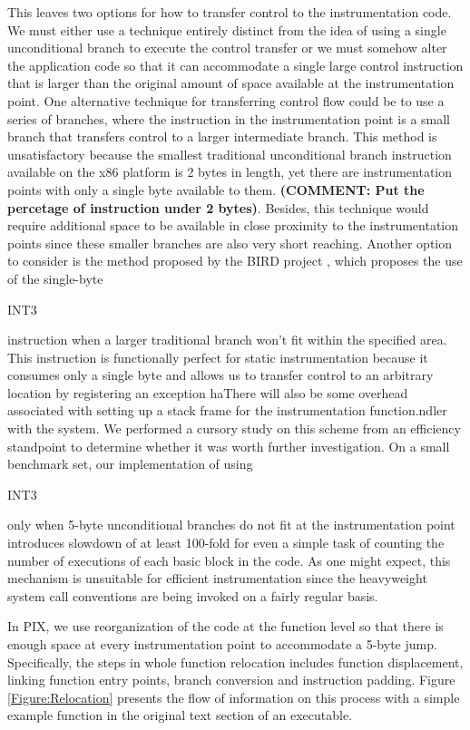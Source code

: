 This leaves two options for how to transfer control to the instrumentation code.
We must either use a technique entirely distinct from the idea of using a single
unconditional branch to execute the control transfer or we must somehow alter the application code so
that it can accommodate a single large control instruction that is larger than
the original amount of space available at the instrumentation point. One alternative
technique for transferring control flow could be to use a series of branches,
where the instruction in the instrumentation point is a small branch that
transfers control to a larger intermediate branch. This
method is unsatisfactory because the smallest traditional unconditional branch instruction available
on the x86 platform is 2 bytes in length, yet there are
instrumentation points with only a single byte available to them. \textbf{(COMMENT: Put the percetage of instruction under 2 bytes)}.
Besides, this technique would
require additional space to be available in close proximity to the instrumentation points since these
smaller branches are also very short reaching. Another option
to consider is the method proposed by the BIRD project \cite{nanda2006bird}, which
proposes the use of the single-byte \begin{it}INT3\end{it} instruction when a larger traditional
branch won't fit within the specified area. This instruction is functionally
perfect for static instrumentation because it consumes only a single byte and
allows us to transfer control to an arbitrary location by registering an
exception haThere will also be some overhead
associated with setting up a stack frame for the instrumentation function.ndler with the system. We performed a cursory study on this scheme
from an efficiency standpoint to determine whether it was worth further
investigation. On a small benchmark set, our implementation of using
\begin{it}INT3\end{it} only when 5-byte unconditional branches do not fit at
the instrumentation point introduces slowdown of at least 100-fold for
even a simple task of counting the number of executions of each basic block in the code. As one might
expect, this mechanism is unsuitable for efficient instrumentation since the
 heavyweight system call conventions are being invoked on a fairly regular basis.

In PIX, we use reorganization of the code at the function level so that
there is enough space at every instrumentation point to accommodate a 5-byte
jump. Specifically, the steps in whole function relocation includes function displacement, linking function entry points,
branch conversion and instruction padding. Figure \ref{Figure:Relocation} presents the flow of information on 
this process with a simple example function in the original text section of an executable.

